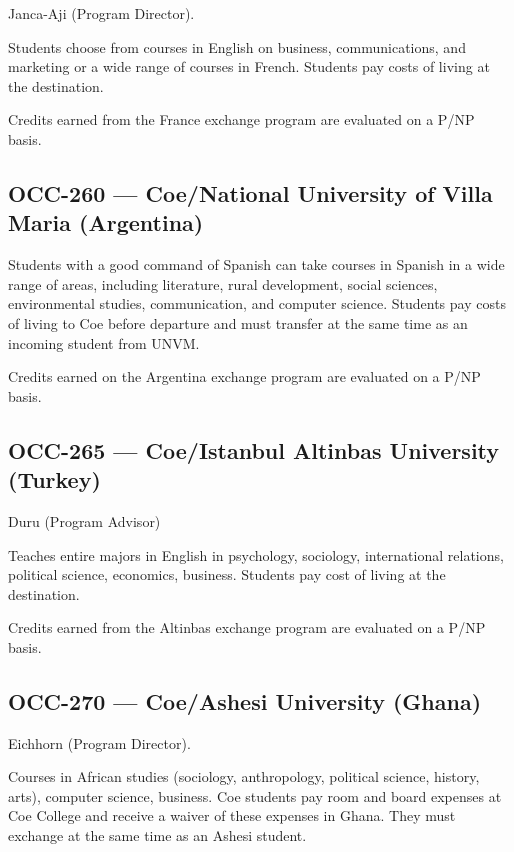 \documentclass[
  letterpaper,
]{scrbook}
\begin{document}
Janca-Aji (Program Director).

Students choose from courses in English on business, communications, and
marketing or a wide range of courses in French. Students pay costs of
living at the destination.

Credits earned from the France exchange program are evaluated on a P/NP
basis.

\subsection{OCC-260 --- Coe/National University of Villa Maria
(Argentina)}\label{occ-260-coenational-university-of-villa-maria-argentina}

Students with a good command of Spanish can take courses in Spanish in a
wide range of areas, including literature, rural development, social
sciences, environmental studies, communication, and computer science.
Students pay costs of living to Coe before departure and must transfer
at the same time as an incoming student from UNVM.

Credits earned on the Argentina exchange program are evaluated on a P/NP
basis.

\subsection{OCC-265 --- Coe/Istanbul Altinbas University
(Turkey)}\label{occ-265-coeistanbul-altinbas-university-turkey}

Duru (Program Advisor)

Teaches entire majors in English in psychology, sociology, international
relations, political science, economics, business. Students pay cost of
living at the destination.

Credits earned from the Altinbas exchange program are evaluated on a
P/NP basis.

\subsection{OCC-270 --- Coe/Ashesi University
(Ghana)}\label{occ-270-coeashesi-university-ghana}

Eichhorn (Program Director).

Courses in African studies (sociology, anthropology, political science,
history, arts), computer science, business. Coe students pay room and
board expenses at Coe College and receive a waiver of these expenses in
Ghana. They must exchange at the same time as an Ashesi student.
\end{document}
